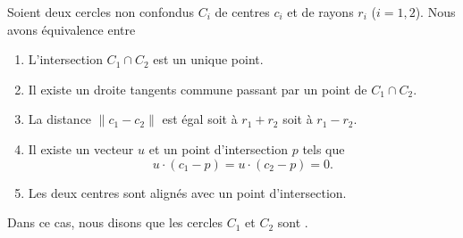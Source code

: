 \begin{propositionDef}	\label{PROPooOCXJooSDeEoB}
	Soient deux cercles non confondus \( C_i\) de centres \( c_i\) et de rayons \( r_i\) (\( i=1,2\)). Nous avons équivalence entre
	\begin{enumerate}
		\item		\label{ITEMooSBZFooIIDgvf}
		      L'intersection \( C_1\cap C_2\) est un unique point.
		\item		\label{ITEMooLZHQooWsbQZl}
		      Il existe un droite tangents commune passant par un point de \( C_1\cap C_2\).
		\item	\label{ITEMooNIZQooSeAWLm}
		      La distance \( \| c_1-c_2 \|\) est égal soit à \( r_1+r_2\) soit à \( r_1-r_2\).
		\item		\label{ITEMooZUKWooPUVpwH}
		      Il existe un vecteur \( u\) et un point d'intersection \( p\) tels que
		      \begin{equation}
			      u\cdot (c_1-p)=u\cdot(c_2-p)=0.
		      \end{equation}
		\item		\label{ITEMooXRTVooUxEHrk}
		      Les deux centres sont alignés avec un point d'intersection.
	\end{enumerate}
	Dans ce cas, nous disons que les cercles \( C_1\) et \( C_2\) sont .
\end{propositionDef}

